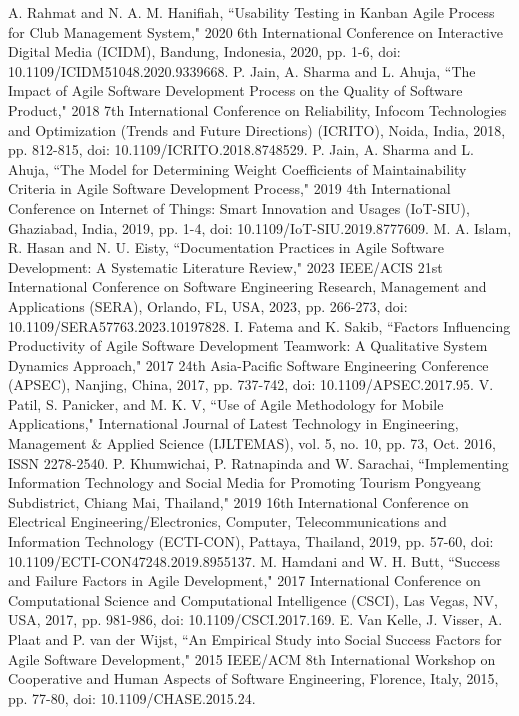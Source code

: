 \documentclass[conference]{IEEEtran}
\begin{document}
\begin{thebibliography}{00}
     A. Rahmat and N. A. M. Hanifiah, ``Usability Testing in Kanban Agile Process for Club Management System," 2020 6th International Conference on Interactive Digital Media (ICIDM), Bandung, Indonesia, 2020, pp. 1-6, doi: 10.1109/ICIDM51048.2020.9339668. 
     P. Jain, A. Sharma and L. Ahuja, ``The Impact of Agile Software Development Process on the Quality of Software Product," 2018 7th International Conference on Reliability, Infocom Technologies and Optimization (Trends and Future Directions) (ICRITO), Noida, India, 2018, pp. 812-815, doi: 10.1109/ICRITO.2018.8748529. 
     P. Jain, A. Sharma and L. Ahuja, ``The Model for Determining Weight Coefficients of Maintainability Criteria in Agile Software Development Process," 2019 4th International Conference on Internet of Things: Smart Innovation and Usages (IoT-SIU), Ghaziabad, India, 2019, pp. 1-4, doi: 10.1109/IoT-SIU.2019.8777609. 
     M. A. Islam, R. Hasan and N. U. Eisty, ``Documentation Practices in Agile Software Development: A Systematic Literature Review," 2023 IEEE/ACIS 21st International Conference on Software Engineering Research, Management and Applications (SERA), Orlando, FL, USA, 2023, pp. 266-273, doi: 10.1109/SERA57763.2023.10197828. 
     I. Fatema and K. Sakib, ``Factors Influencing Productivity of Agile Software Development Teamwork: A Qualitative System Dynamics Approach," 2017 24th Asia-Pacific Software Engineering Conference (APSEC), Nanjing, China, 2017, pp. 737-742, doi: 10.1109/APSEC.2017.95. 
     V. Patil, S. Panicker, and M. K. V, ``Use of Agile Methodology for Mobile Applications," International Journal of Latest Technology in Engineering, Management \& Applied Science (IJLTEMAS), vol. 5, no. 10, pp. 73, Oct. 2016, ISSN 2278-2540.
     P. Khumwichai, P. Ratnapinda and W. Sarachai, ``Implementing Information Technology and Social Media for Promoting Tourism Pongyeang Subdistrict, Chiang Mai, Thailand," 2019 16th International Conference on Electrical Engineering/Electronics, Computer, Telecommunications and Information Technology (ECTI-CON), Pattaya, Thailand, 2019, pp. 57-60, doi: 10.1109/ECTI-CON47248.2019.8955137.
     M. Hamdani and W. H. Butt, ``Success and Failure Factors in Agile Development," 2017 International Conference on Computational Science and Computational Intelligence (CSCI), Las Vegas, NV, USA, 2017, pp. 981-986, doi: 10.1109/CSCI.2017.169.
     E. Van Kelle, J. Visser, A. Plaat and P. van der Wijst, ``An Empirical Study into Social Success Factors for Agile Software Development," 2015 IEEE/ACM 8th International Workshop on Cooperative and Human Aspects of Software Engineering, Florence, Italy, 2015, pp. 77-80, doi: 10.1109/CHASE.2015.24.

\end{thebibliography}
\end{document}
